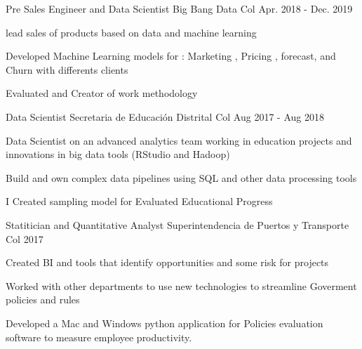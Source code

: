 \begin{cventries}
  \cventry
    {Pre Sales Engineer and Data Scientist} %
    {Big Bang Data} %
    {Col} %
    {Apr. 2018 - Dec. 2019} %
    {
      \begin{cvitems} %
        \item {lead sales of products based on data and machine learning}
        \item {Developed Machine Learning models for : Marketing , Pricing , forecast, and Churn with differents clients}
        \item {Evaluated and Creator of work methodology}
      \end{cvitems}
    }
    


    \cventry
    {Data Scientist }%
    {Secretaria de Educación Distrital} %
    {Col} %
    {Aug 2017 - Aug 2018} %
    {
    \begin{cvitems} 
     \item {Data Scientist on an advanced analytics team working in education projects and innovations in big data tools (RStudio and Hadoop)}
      \item {Build and own complex data pipelines using SQL and other data processing tools}
       \item {I Created sampling model for Evaluated Educational Progress}
       \end{cvitems}
    }



    \cventry
    {Statitician and Quantitative Analyst}%
    {Superintendencia de Puertos y Transporte} %
    {Col} %
    {2017} %
    {
    \begin{cvitems} 
     \item {Created BI and tools that identify opportunities and some risk for projects}
      \item {Worked with other departments to use new technologies to streamline Goverment policies and rules}
       \item {Developed a Mac and Windows python application for Policies evaluation  software to measure employee productivity.}
       \end{cvitems}
    }



\end{cventries}
